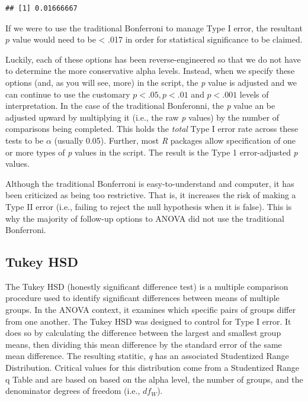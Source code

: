 \documentclass[
  11pt,
]{book}
\begin{document}
\begin{verbatim}
## [1] 0.01666667
\end{verbatim}

If we were to use the traditional Bonferroni to manage Type I error, the resultant \(p\) value would need to be \textless{} .017 in order for statistical significance to be claimed.

Luckily, each of these options has been reverse-engineered so that we do not have to determine the more conservative alpha levels. Instead, when we specify these options (and, as you will see, more) in the script, the \emph{p} value is adjusted and we can continue to use the customary \(p < .05, p < .01\) and \(p < .001\) levels of interpretation. In the case of the traditional Bonferonni, the \emph{p} value an be adjusted upward by multiplying it (i.e., the raw \emph{p} values) by the number of comparisons being completed. This holds the \emph{total} Type I error rate across these tests to be \(\alpha\) (usually 0.05). Further, most \emph{R} packages allow specification of one or more types of \emph{p} values in the script. The result is the Type 1 error-adjusted \emph{p} values.

Although the traditional Bonferroni is easy-to-understand and computer, it has been criticized as being too restrictive. That is, it increases the risk of making a Type II error (i.e., failing to reject the null hypothesis when it is false). This is why the majority of follow-up options to ANOVA did not use the traditional Bonferroni.

\hypertarget{tukey-hsd}{%
\subsection*{Tukey HSD}\label{tukey-hsd}}


The Tukey HSD (honestly significant difference test) is a multiple comparison procedure used to identify significant differences between means of multiple groups. In the ANOVA context, it examines which specific pairs of groups differ from one another. The Tukey HSD was designed to control for Type I error. It does so by calculating the difference between the largest and smallest group means, then dividing this mean difference by the standard error of the same mean difference. The resulting statitic, \emph{q} has an associated Studentized Range Distribution. Critical values for this distribution come from a Studentized Range q Table and are based on based on the alpha level, the number of groups, and the denominator degrees of freedom (i.e., \(df_W\)).
\end{document}

